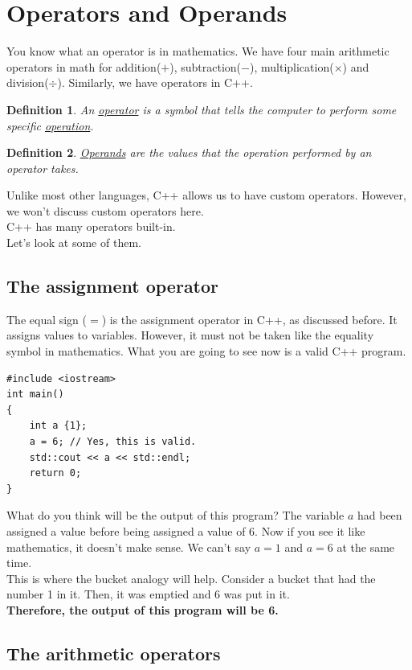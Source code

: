 \documentclass[letterpaper, 12pt]{book}
\newtheorem{definition}{Definition}
\begin{document}
\section{Operators and Operands}
You know what an operator is in mathematics. We have four main arithmetic operators in math for addition($+$), subtraction($-$), multiplication($\times$) and division($\div$). Similarly, we have operators in C++.
\begin{definition}
	An \underline{operator} is a symbol that tells the computer to perform some specific \underline{operation}. 
\end{definition}
\begin{definition}
	\underline{Operands} are the values that the operation performed by an operator takes.
\end{definition}
Unlike most other languages, C++ allows us to have custom operators. However, we won't discuss custom operators here.\\
C++ has many operators built-in.\\
Let's look at some of them.
\subsection{The assignment operator}
The equal sign ($=$) is the assignment operator in C++, as discussed before. It assigns values to variables. However, it must not be taken like the equality symbol in mathematics. What you are going to see now is a valid C++ program.
\begin{lstlisting}
#include <iostream>
int main()
{
	int a {1};
	a = 6; // Yes, this is valid.
	std::cout << a << std::endl;
	return 0;
}
\end{lstlisting}
What do you think will be the output of this program? The variable $a$ had been assigned a value before being assigned a value of 6. Now if you see it like mathematics, it doesn't make sense. We can't say $a = 1$ and $a = 6$ at the same time.\\
This is where the bucket analogy will help. Consider a bucket that had the number 1 in it. Then, it was emptied and 6 was put in it.\\
\textbf{Therefore, the output of this program will be 6.}
\subsection{The arithmetic operators}
\end{document}
